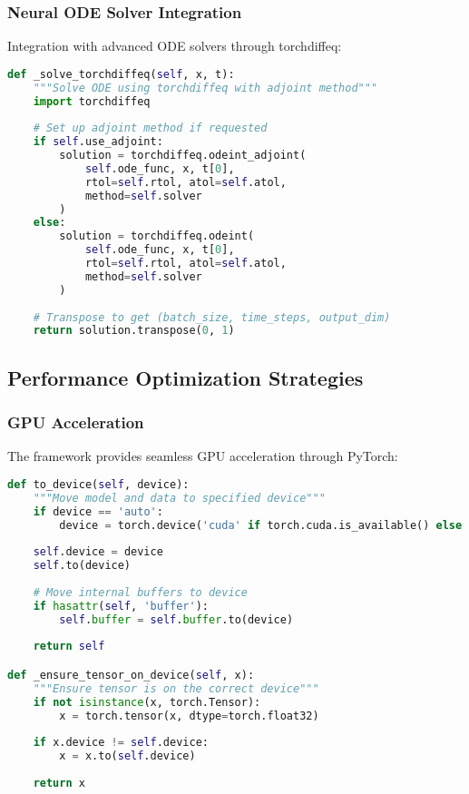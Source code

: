 \subsubsection{Neural ODE Solver Integration}

Integration with advanced ODE solvers through torchdiffeq:

\begin{lstlisting}[language=Python, caption=Neural ODE Solver Integration]
def _solve_torchdiffeq(self, x, t):
    """Solve ODE using torchdiffeq with adjoint method"""
    import torchdiffeq
    
    # Set up adjoint method if requested
    if self.use_adjoint:
        solution = torchdiffeq.odeint_adjoint(
            self.ode_func, x, t[0], 
            rtol=self.rtol, atol=self.atol,
            method=self.solver
        )
    else:
        solution = torchdiffeq.odeint(
            self.ode_func, x, t[0], 
            rtol=self.rtol, atol=self.atol,
            method=self.solver
        )
    
    # Transpose to get (batch_size, time_steps, output_dim)
    return solution.transpose(0, 1)
\end{lstlisting}

\subsection{Performance Optimization Strategies}

\subsubsection{GPU Acceleration}

The framework provides seamless GPU acceleration through PyTorch:

\begin{lstlisting}[language=Python, caption=GPU Acceleration]
def to_device(self, device):
    """Move model and data to specified device"""
    if device == 'auto':
        device = torch.device('cuda' if torch.cuda.is_available() else 'cpu')
    
    self.device = device
    self.to(device)
    
    # Move internal buffers to device
    if hasattr(self, 'buffer'):
        self.buffer = self.buffer.to(device)
    
    return self

def _ensure_tensor_on_device(self, x):
    """Ensure tensor is on the correct device"""
    if not isinstance(x, torch.Tensor):
        x = torch.tensor(x, dtype=torch.float32)
    
    if x.device != self.device:
        x = x.to(self.device)
    
    return x
\end{lstlisting}

